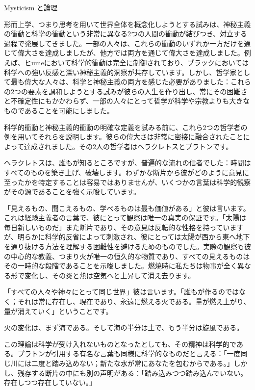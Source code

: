 \documentclass[a4paper,11pt,openany]{ltjsbook}
\begin{document}
Mysticism と論理


形而上学、つまり思考を用いて世界全体を概念化しようとする試みは、神秘主義の衝動と科学の衝動という非常に異なる2つの人間の衝動が結びつき、対立する過程で発展してきました。一部の人々は、これらの衝動のいずれか一方だけを通じて偉大さを達成しましたが、他方では両方を通じて偉大さを達成しました。例えば、ヒumeにおいて科学的衝動は完全に制御されており、ブラックにおいては科学への強い反感と深い神秘主義的洞察が共存しています。しかし、哲学家として最も偉大な人々は、科学と神秘主義の両方を感じた必要がありました：これらの2つの要素を調和しようとする試みが彼らの人生を作り出し、常にその困難さと不確定性にもかかわらず、一部の人々にとって哲学が科学や宗教よりも大きなものであることを可能にしました。

科学的衝動と神秘主義的衝動の明確な定義を試みる前に、これら2つの哲学者の例を用いてそれらを説明します。彼らの偉大さは非常に密接に融合されたことによって達成されました。その2人の哲学者はヘラクレトスとプラトンです。

ヘラクレトスは、誰もが知るところですが、普遍的な流れの信者でした：時間はすべてのものを築き上げ、破壊します。わずかな断片から彼がどのように意見に至ったかを特定することは容易ではありませんが、いくつかの言葉は科学的観察がその源であることを強く示唆しています。

「見えるもの、聞こえるもの、学べるものは最も価値がある」と彼は言います。これは経験主義者の言葉で、彼にとって観察は唯一の真実の保証です。「太陽は毎日新しいものだ」また断片であり、その意見は反転的な性格を持っていますが、明らかに科学的反省によって刺激され、彼にとっては太陽が西から東へ地下を通り抜ける方法を理解する困難性を避けるためのものでした。実際の観察も彼の中心的な教義、つまり火が唯一の恒久的な物質であり、すべての見えるものはその一時的な段階であることを示唆しました。燃焼時に私たちは物事が全く異なる形で変化し、その炎と熱は空気へと上昇して消え去ります。

「すべての人々や神々にとって同じ世界」彼は言います。「誰もが作るのではなく；それは常に存在し、現在であり、永遠に燃える火である。量が燃え上がり、量が消えていく」ということです。

火の変化は、まず海である。そして海の半分は土で、もう半分は旋風である。

この理論は科学が受け入れないものとなったとしても、その精神は科学的である。プラトンが引用する有名な言葉も同様に科学的なものだと言える：「一度同じ川には二度と踏み込めない；新たな水が常にあなたを包むからである。」しかし、残存する断片の中にも別の声明がある：「踏み込みつつ踏み込んでいない。存在しつつ存在していない。」
\end{document}
